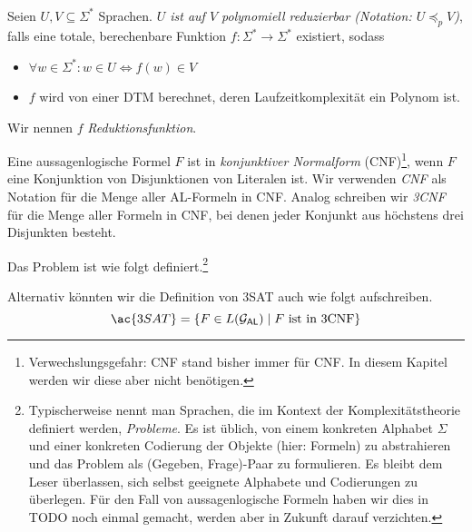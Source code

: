 \begin{Def}\label{def:PolyReduktion}\ \\
  Seien $U, V \subseteq \Sigma^*$ Sprachen.
  \emph{$U$ ist auf $V$ polynomiell reduzierbar (Notation: $U \preceq_p V$)}, falls eine totale, berechenbare Funktion
  $f:\Sigma^* \to \Sigma^*$ existiert, sodass
  \begin{itemize}
   \item $\forall w \in \Sigma^*:w \in U \iff f(w) \in V$
   \item $f$ wird von einer \ac{DTM} berechnet, deren Laufzeitkomplexität ein Polynom ist.
  \end{itemize}
  Wir nennen $f$ \emph{Reduktionsfunktion}.
\end{Def}

Eine aussagenlogische Formel $F$ ist in \emph{konjunktiver Normalform} (CNF)\footnote{%
Verwechslungsgefahr: \ac{CNF} stand bisher immer für \acl{CNF}.
In diesem Kapitel werden wir diese aber nicht benötigen.
}, wenn $F$ eine Konjunktion von Disjunktionen von Literalen ist.
Wir verwenden \emph{CNF} als Notation für die Menge aller AL-Formeln in CNF.
Analog schreiben wir \emph{3CNF} für die Menge aller Formeln in CNF, bei denen jeder Konjunkt aus höchstens drei Disjunkten besteht.



\begin{Def}[name={[3SAT]}]
Das Problem  ist wie folgt definiert.\footnote{
Typischerweise nennt man Sprachen, die im Kontext der Komplexitätstheorie definiert werden, \emph{Probleme}.
Es ist üblich, von einem konkreten Alphabet $\Sigma$ und einer konkreten Codierung der Objekte (hier: Formeln) zu abstrahieren und das Problem als (Gegeben, Frage)-Paar zu formulieren.
Es bleibt dem Leser überlassen, sich selbst geeignete Alphabete und Codierungen zu überlegen.
Für den Fall von aussagenlogische Formeln haben wir dies in {\color{red} TODO} noch einmal gemacht, werden aber in Zukunft darauf verzichten.}
\begin{center}
\end{center}
	
\end{Def}
Alternativ könnten wir die Definition von \ac{3SAT} auch wie folgt aufschreiben.
$$\ac{3SAT} = \{F\in L(\mathcal{G}_\mathsf{AL})\mid F \text{ ist in 3CNF}\}$$

